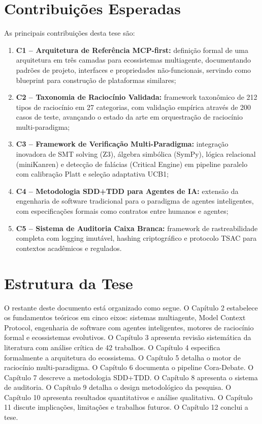 \documentclass[12pt,a4paper,sumario=tradicional]{abntex2}
\begin{document}
\section{Contribuições Esperadas}

As principais contribuições desta tese são:

\begin{enumerate}[leftmargin=*]
    \item \textbf{C1 -- Arquitetura de Referência MCP-first:} definição formal de uma arquitetura em três camadas para ecossistemas multiagente, documentando padrões de projeto, interfaces e propriedades não-funcionais, servindo como blueprint para construção de plataformas similares;
    \item \textbf{C2 -- Taxonomia de Raciocínio Validada:} framework taxonômico de 212 tipos de raciocínio em 27 categorias, com validação empírica através de 200 casos de teste, avançando o estado da arte em orquestração de raciocínio multi-paradigma;
    \item \textbf{C3 -- Framework de Verificação Multi-Paradigma:} integração inovadora de SMT solving (Z3), álgebra simbólica (SymPy), lógica relacional (miniKanren) e detecção de falácias (Critical Engine) em pipeline paralelo com calibração Platt e seleção adaptativa UCB1;
    \item \textbf{C4 -- Metodologia SDD+TDD para Agentes de IA:} extensão da engenharia de software tradicional para o paradigma de agentes inteligentes, com especificações formais como contratos entre humanos e agentes;
    \item \textbf{C5 -- Sistema de Auditoria Caixa Branca:} framework de rastreabilidade completa com logging imutável, hashing criptográfico e protocolo TSAC para contextos acadêmicos e regulados.
\end{enumerate}

\section{Estrutura da Tese}

O restante deste documento está organizado como segue. O Capítulo 2 estabelece os fundamentos teóricos em cinco eixos: sistemas multiagente, Model Context Protocol, engenharia de software com agentes inteligentes, motores de raciocínio formal e ecossistemas evolutivos. O Capítulo 3 apresenta revisão sistemática da literatura com análise crítica de 42 trabalhos. O Capítulo 4 especifica formalmente a arquitetura do ecossistema. O Capítulo 5 detalha o motor de raciocínio multi-paradigma. O Capítulo 6 documenta o pipeline Cora-Debate. O Capítulo 7 descreve a metodologia SDD+TDD. O Capítulo 8 apresenta o sistema de auditoria. O Capítulo 9 detalha o design metodológico da pesquisa. O Capítulo 10 apresenta resultados quantitativos e análise qualitativa. O Capítulo 11 discute implicações, limitações e trabalhos futuros. O Capítulo 12 conclui a tese.
\end{document}
